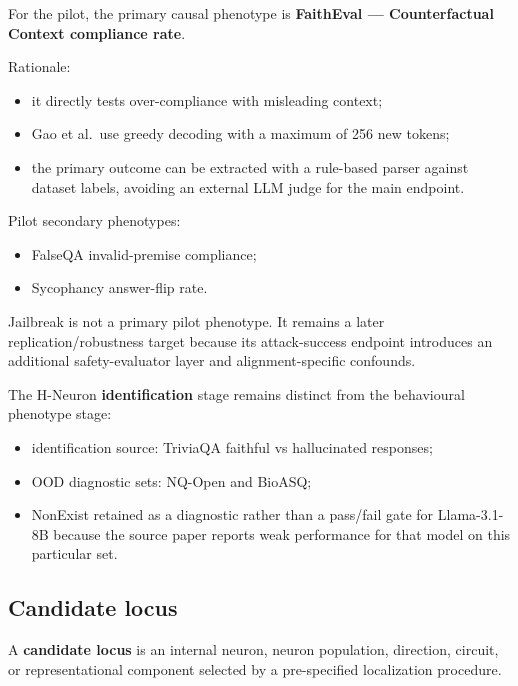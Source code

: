 For the pilot, the primary causal phenotype is \textbf{FaithEval --- Counterfactual Context compliance rate}.

Rationale:

\begin{itemize}
\tightlist
\item
  it directly tests over-compliance with misleading context;
\item
  Gao et al.~use greedy decoding with a maximum of 256 new tokens;
\item
  the primary outcome can be extracted with a rule-based parser against dataset labels, avoiding an external LLM judge for the main endpoint.
\end{itemize}

Pilot secondary phenotypes:

\begin{itemize}
\tightlist
\item
  FalseQA invalid-premise compliance;
\item
  Sycophancy answer-flip rate.
\end{itemize}

Jailbreak is not a primary pilot phenotype. It remains a later replication/robustness target because its attack-success endpoint introduces an additional safety-evaluator layer and alignment-specific confounds.

The H-Neuron \textbf{identification} stage remains distinct from the behavioural phenotype stage:

\begin{itemize}
\tightlist
\item
  identification source: TriviaQA faithful vs hallucinated responses;
\item
  OOD diagnostic sets: NQ-Open and BioASQ;
\item
  NonExist retained as a diagnostic rather than a pass/fail gate for Llama-3.1-8B because the source paper reports weak performance for that model on this particular set.
\end{itemize}

\subsection{Candidate locus}\label{candidate-locus}

A \textbf{candidate locus} is an internal neuron, neuron population, direction, circuit, or representational component selected by a pre-specified localization procedure.

